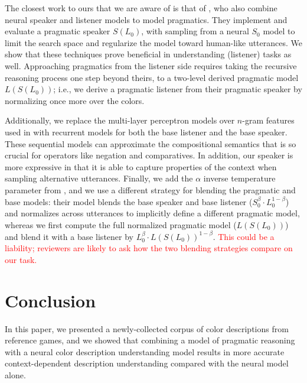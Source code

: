 \documentclass[11pt,letterpaper]{article}
\newcommand{\Listener}{L}
\newcommand{\Speaker}{S}
\renewcommand{\|}{\mid}
\newcommand{\todocheck}[1]{\textcolor{red}{#1}}
\begin{document}
The closest work to ours that we are aware of is that of
, who also combine neural speaker
and listener models to model pragmatics. They implement and evaluate a
pragmatic speaker $\Speaker(\Listener_0)$, with sampling from a neural
$\Speaker_0$ model to limit the search space and regularize the model toward
human-like utterances. We show that these techniques prove beneficial in
understanding (listener) tasks as well. Approaching pragmatics from the listener
side requires taking the recursive reasoning process one step beyond theirs, to a
two-level derived pragmatic model $\Listener(\Speaker(\Listener_0))$; i.e., we
derive a pragmatic listener from their pragmatic speaker by normalizing once more
over the colors.

Additionally, we replace the multi-layer perceptron models over
$n$-gram features used in 
with recurrent models for both the base listener and the base speaker.
These sequential models can approximate the compositional semantics
that is so crucial for operators like negation and comparatives. In
addition, our speaker is more expressive in that it is able to capture
properties of the context when sampling alternative utterances.
Finally, we add the $\alpha$ inverse temperature parameter from
, and we use a different strategy for blending
the pragmatic and base models: their model blends the base speaker and
base listener ($\Speaker_0^{\beta} \cdot \Listener_0^{1 - \beta}$) and
normalizes across utterances to implicitly define a different
pragmatic model, whereas we first compute the full normalized
pragmatic model ($\Listener(\Speaker(\Listener_0))$) and blend it with
a base listener by
$\Listener_0^{\beta} \cdot \Listener(\Speaker(\Listener_0))^{1 -
  \beta}$. \todocheck{This could be a liability; reviewers are likely
to ask how the two blending strategies compare on our task.}

\section{Conclusion} \label{sec:conclusion}

In this paper, we presented a newly-collected corpus of color descriptions from
reference games, and we showed that combining a model of pragmatic reasoning
with a neural color description understanding model results in more accurate
context-dependent description understanding compared with the neural model alone.
\end{document}
